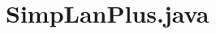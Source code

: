 \documentclass[../report.tex]{subfiles}
\begin{document}
\chapter{SimpLanPlus.java}\label{c:simplanplus-java}
\end{document}
